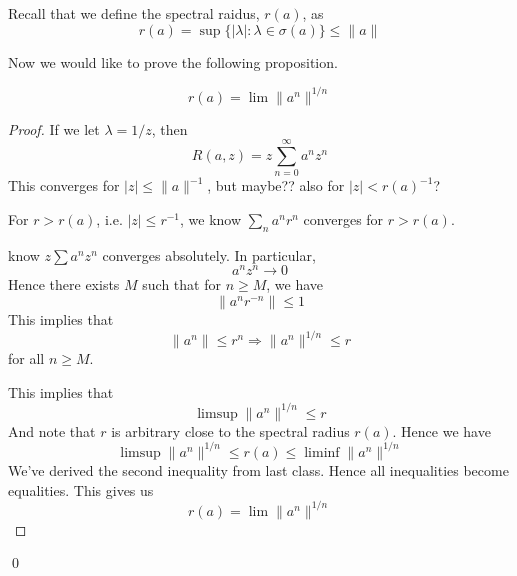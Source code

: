 Recall that we define the spectral raidus, $r(a)$, as 
\begin{equation*}
    r(a)=\sup\{|\lambda|:\lambda\in\sigma(a)\}\leq\|a\|
\end{equation*}

Now we would like to prove the following proposition.
\begin{proposition}
    \begin{equation*}
        r(a)=\lim\|a^n\|^{1/n}
    \end{equation*}
\end{proposition}

\begin{proof}

If we let $\lambda=1/z$, then 
\begin{equation*}
    R(a,z)=z\sum_{n=0}^\infty a^nz^n
\end{equation*}
This converges for $|z|\leq\|a\|^{-1}$, but maybe?? also for $|z|< r(a)^{-1}$?

For $r>r(a)$, i.e. $|z|\leq r^{-1}$, we  know $\sum_na^nr^n$ converges for $r>r(a)$. 

know $z\sum a^nz^n$ converges absolutely. In particular,
\begin{equation*}
    a^nz^n\to 0
\end{equation*}
Hence there exists $M$ such that for $n\geq M$, we have
\begin{equation*}
    \|a^nr^{-n}\|\leq 1
\end{equation*}
This implies that
\begin{equation*}
    \|a^n\|\leq r^n \Rightarrow \|a^n\|^{1/n}\leq r 
\end{equation*}
for all $n\geq M$.

This implies that
\begin{equation*}
    \limsup \|a^n\|^{1/n}\leq r
\end{equation*}
And note that $r$ is arbitrary close to the spectral radius $r(a)$. Hence we have
\begin{equation*}
    \limsup \|a^n\|^{1/n}\leq r(a)\leq\liminf\|a^n\|^{1/n}
\end{equation*}
We've derived the second inequality from last class. Hence all inequalities become equalities.
This gives us
\begin{equation*}
    r(a)=\lim \|a^n\|^{1/n}
\end{equation*}

\end{proof}
\qed


